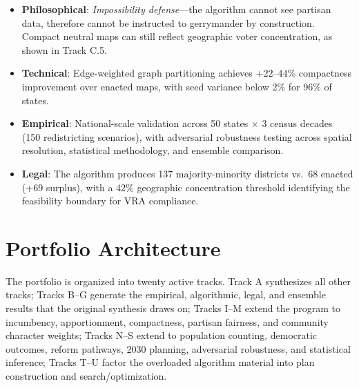 \documentclass[12pt]{article}
\begin{document}
\begin{itemize}[leftmargin=*,noitemsep,topsep=4pt]
    \item \textbf{Philosophical}: \emph{Impossibility defense}---the algorithm
        cannot see partisan data, therefore cannot be instructed to gerrymander
        by construction. Compact neutral maps can still reflect geographic voter
        concentration, as shown in Track C.5.

    \item \textbf{Technical}: Edge-weighted graph partitioning achieves
        $+22$--$44\%$ compactness improvement over enacted maps, with seed
        variance below 2\% for 96\% of states.

    \item \textbf{Empirical}: National-scale validation across 50 states
        $\times$ 3 census decades (150 redistricting scenarios), with
        adversarial robustness testing across spatial resolution, statistical
        methodology, and ensemble comparison.

    \item \textbf{Legal}: The algorithm produces 137 majority-minority
        districts vs.\ 68 enacted (+69 surplus), with a 42\% geographic
        concentration threshold identifying the feasibility boundary for VRA
        compliance.
\end{itemize}


\section{Portfolio Architecture}

The portfolio is organized into twenty active tracks. Track A synthesizes all
other tracks; Tracks B--G generate the empirical, algorithmic, legal, and
ensemble results that the original synthesis draws on; Tracks I--M extend the
program to incumbency, apportionment, compactness, partisan fairness, and
community character weights; Tracks N--S extend to population counting,
democratic outcomes, reform pathways, 2030 planning, adversarial robustness,
and statistical inference; Tracks T--U factor the overloaded algorithm material
into plan construction and search/optimization.

\vspace{6pt}
\end{document}
